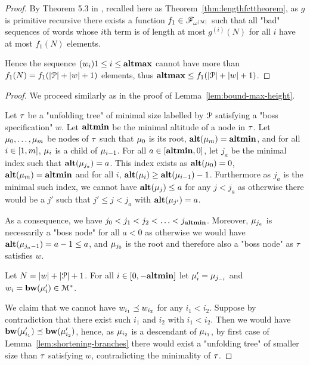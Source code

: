 \begin{proof}
	By Theorem 5.3 in \cite{SchmitzS2011upperHigman}, recalled here as Theorem~\ref{thm:lengthfcttheorem}, as $g$ is primitive recursive there exists a function $f_1 \in \mathscr{F}_{\omega^{|\mathcal{M}|}}$ such that all "bad" sequences of words whose $i$th term is of length at most $g^{(i)}(N)$ for all $i$ have at most $f_1(N)$ elements.
	
	Hence the sequence $(w_i){1\leq i \leq \mathbf{altmax}}$ cannot have more than $f_1(N) = f_1(|\mathcal{P}| + |w| + 1)$ elements, thus $\mathbf{altmax} \leq f_1(|\mathcal{P}| + |w| + 1)$.
\end{proof}

\lemBoundMinHeight*

\begin{proof}
	We proceed similarly as in the proof of Lemma~\ref{lem:bound-max-height}. 
	
	Let $\tau$ be a "unfolding tree" of minimal size labelled by $\mathcal{P}$ satisfying a "boss specification" $w$. Let $\mathbf{altmin}$ be the minimal altitude of a node in $\tau$. Let $\mu_0, \ldots, \mu_m$ be nodes of $\tau$ such that $\mu_0$ is its root, $\mathbf{alt}(\mu_m) = \mathbf{altmin}$, and for all $i\in [1,m]$, $\mu_i$ is a child of $\mu_{i-1}$.
	For all $a \in [\mathbf{altmin},0]$, let $j_a$ be the minimal index such that $\mathbf{alt}(\mu_{j_a}) = a$. This index exists as $\mathbf{alt}(\mu_0) = 0$, $\mathbf{alt}(\mu_m) = \mathbf{altmin}$ and for all $i$, $\mathbf{alt}(\mu_{i}) \geq \mathbf{alt}(\mu_{i-1})-1$.
	Furthermore as $j_a$ is the minimal such index, we cannot have $\mathbf{alt}(\mu_j) \leq a$ for any $j < j_a$ as otherwise there would be a $j'$ such that $j' \leq j < j_a$ with $\mathbf{alt}(\mu_{j'}) = a$.
	
	As a consequence, we have $j_0 < j_1 < j_2 < \ldots < j_{\mathbf{altmin}}$. Moreover, $\mu_{j_a}$ is necessarily a "boss node" for all $a<0$ as otherwise we would have $\mathbf{alt}(\mu_{j_a-1}) = a-1 \leq a$, and $\mu_{j_0}$ is the root and therefore also a "boss node" as $\tau$ satisfies $w$.
	
	Let $N = |w| + |\mathcal{P}|+1$. For all $i \in [0,-\mathbf{altmin}]$ let $\mu'_i = \mu_{j_{-i}}$ and $w_i = \mathbf{bw}(\mu'_{i}) \in \mathcal{M}^*$.
	
	We claim that we cannot have $w_{i_1}\preceq w_{i_2}$ for any  $i_1< i_2$.
	Suppose by contradiction that there exist such $i_1$ and $i_2$ with $i_1 < i_2$. Then we would have $\mathbf{bw}(\mu'_{i_1}) \preceq \mathbf{bw}(\mu'_{i_2})$, hence, as $\mu_{i_2}$ is a descendant of $\mu_{i_1}$, by first case of Lemma~\ref{lem:shortening-branches} there would exist a "unfolding tree" of smaller size than $\tau$ satisfying $w$, contradicting the minimality of $\tau$.
	

\end{proof}
